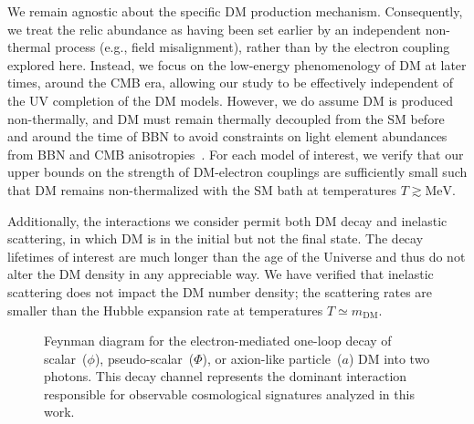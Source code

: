 We remain agnostic about the specific DM production mechanism. Consequently, we treat the relic abundance as having been set earlier by an independent non-thermal process (e.g., field misalignment), rather than by the electron coupling explored here.
Instead, we focus on the low-energy phenomenology of DM at later times, around the CMB era, allowing our study to be effectively independent of the UV completion of the DM models. However, we do assume DM is produced non-thermally, and DM must remain thermally decoupled from the SM before and around the time of BBN to avoid constraints on light element abundances from BBN and CMB anisotropies~\cite{Boehm:2002yz,Serpico:2004nm,Nollett:2013pwa,Steigman:2014pfa,Nollett:2014lwa,Escudero:2018mvt,Sabti:2019mhn,Giovanetti:2021izc,An:2022sva,An:2024nsw}.
For each model of interest, we verify that our upper bounds on the strength of DM-electron couplings are sufficiently small such that DM remains non-thermalized with the SM bath at temperatures $T \gtrsim \mathrm{MeV}$.

Additionally, the interactions we consider permit both DM decay and inelastic scattering, in which DM is in the initial but not the final state.
The decay lifetimes of interest are much longer than the age of the Universe and thus do not alter the DM density in any appreciable way.
We have verified that inelastic scattering does not impact the DM number density; the scattering rates are smaller than the Hubble expansion rate at temperatures $T \simeq m_\mathrm{DM}$.

\begin{figure}[ht!]
  \centering
  \caption[Feynman diagram for DM decay into two photons]{Feynman diagram for the electron-mediated one-loop decay of scalar~($\phi$), pseudo-scalar~($\Phi$), or axion-like particle~($a$) DM into two photons.  This decay channel represents the dominant interaction responsible for observable cosmological signatures analyzed in this work.
  }
  \label{fig:ch9-loop_diagram}
\end{figure}

